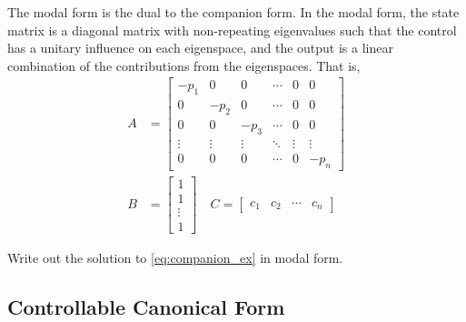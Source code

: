 The modal form is the dual to the companion form. In the modal form, the state matrix is a diagonal matrix with non-repeating eigenvalues such that the control has a unitary influence on each eigenspace, and the output is a linear combination of the contributions from the eigenspaces. That is,
%
\begin{subequations}
	\begin{align}
	A &= \begin{bmatrix} -p_1 & 0 & 0 & \cdots & 0 & 0 \\
	0 & -p_2 & 0 & \cdots & 0 & 0 \\
	0 & 0 & -p_3 & \cdots & 0 & 0 \\
	\vdots & \vdots & \vdots &\ddots & \vdots & \vdots \\
	0 & 0 & 0 & \cdots & 0 & -p_n
	\end{bmatrix} \\
	B &= \begin{bmatrix} 1 \\ 1 \\ \vdots \\ 1 \end{bmatrix} \quad
	C = \begin{bmatrix} c_1 & c_2  & \cdots & c_n \end{bmatrix}
	\end{align}
\end{subequations}
%
\begin{homework}
	Write out the solution to \autoref{eq:companion_ex} in modal form.
\end{homework}

\subsection{Controllable Canonical Form}


